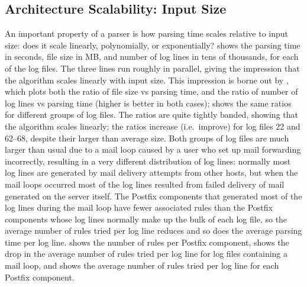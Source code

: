 \subsection{Architecture Scalability: Input Size}

An important property of a parser is how parsing time scales relative to
input size: does it scale linearly, polynomially, or exponentially?
 shows the
parsing time in seconds, file size in MB, and number of log lines in tens
of thousands, for each of the \numberOFlogFILES{} log files.  The three
lines run roughly in parallel, giving the impression that the algorithm
scales linearly with input size.  This impression is borne out by
, which
plots both the ratio of file size vs parsing time, and the ratio of number
of log lines vs parsing time (higher is better in both cases);
shows the same ratios for different groups of log files.  The ratios are
quite tightly banded, showing that the algorithm scales linearly; the
ratios increase (i.e.\ improve) for log files 22 and 62--68, despite their
larger than average size.  Both groups of log files are much larger than
usual due to a mail loop caused by a user who set up mail forwarding
incorrectly, resulting in a very different distribution of log lines:
normally most log lines are generated by mail delivery attempts from other
hosts, but when the mail loops occurred most of the log lines resulted from
failed delivery of mail generated on the server itself.  The Postfix
components that generated most of the log lines during the mail loop have
fewer associated rules than the Postfix components whose log lines normally
make up the bulk of each log file, so the average number of rules tried per
log line reduces and so does the average parsing time per log line.
 shows the number of rules
per Postfix component,  shows the drop in the average number of rules tried per log line for
log files containing a mail loop, and  shows the average number of
rules tried per log line for each Postfix component.


